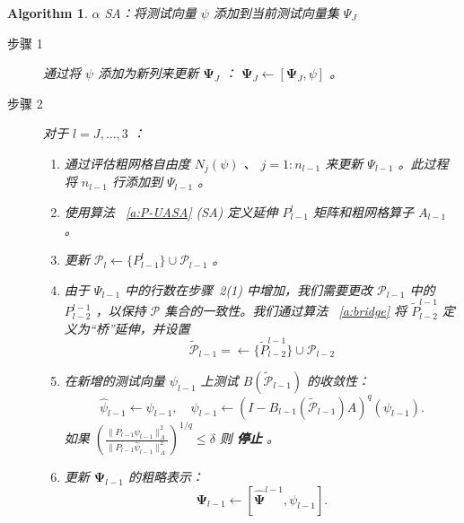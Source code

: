 \documentclass[12pt]{acta_2011xz}
\newcommand{\dof}{\ensuremath{N}}
\newtheorem{algorithm}[equation]{Algorithm}
\begin{document}
   \begin{algorithm}   \caption{   $\alpha$    SA：将测试向量    $\psi$    添加到当前测试向量集    $\Psi_J$       \label{a:SA}     }    
   \begin{description}   \item    [步骤 1] 通过将          $\psi$          添加为新列来更新          $\bm{\Psi}_J$         ：
         \(\bm{\Psi}_J\leftarrow [\bm{\Psi}_J, \psi]\)          。
   \item    [步骤 2] 对于          $l=J, \dots, 3$         ：
   \begin{enumerate}[(1)]

    \item   通过评估粗网格自由度                $\dof_j(\psi)$                、
               $j=1:n_{l-1}$                来更新                $\Psi_{l-1}$                。此过程将                $n_{l-1}$                行添加到                $\Psi_{l-1}$                。   \item   使用算法~    \ref{a:P-UASA}    (SA) 定义延伸
               $P_{l-1}^l$                矩阵和粗网格算子                $A_{l-1}$                。   \item   更新                $\mathcal{P}_{l} \leftarrow  \{ P_{l-1}^l \} \cup \mathcal{P}_{l-1}$                。   \item   由于                $\Psi_{l-1}$                中的行数在步骤~2(1) 中增加，我们需要更改                $\mathcal{P}_{l-1}$                中的                $P_{l-2}^{l-1}$               ，以保持                $\mathcal{P}$                集合的一致性。我们通过算法~   \ref{a:bridge}    将                $\widetilde{P}_{l-2}^{l-1}$                定义为“桥”延伸，并设置                \[
\widetilde{\mathcal{P}}_{l-1} = 
\leftarrow  \{ \widetilde{P}_{l-2}^{l-1} \} \cup \mathcal{P}_{l-2} 
\]                  \item   在新增的测试向量                $\psi_{l-1}$                上测试                $B(\widetilde{\mathcal{P}}_{l-1})$                的收敛性：
   \begin{equation*}
\hat \psi_{l-1}\leftarrow \psi_{l-1},\quad
\psi_{l-1}\leftarrow (I - B_{l-1}(\widetilde{\mathcal{P}}_{l-1})A)^q(\psi_{l-1}).
\end{equation*}    如果
               $\left(\frac{\|P_{l-1}\psi_{l-1}\|^2_A}{\|P_{l-1}\widehat\psi_{l-1}\|^2_A}\right)^{1/q}\le
\delta$                则  {    \bf    停止   }  。   \item   更新                $\bm{\Psi}_{l-1}$                的粗略表示：
   \begin{equation*}
      \bm{\Psi}_{l-1}\leftarrow [\hat{\bm{\Psi}}^{l-1}, \psi_{l-1}].
    \end{equation*}     \end{enumerate}     \end{description}     \end{algorithm}     
\end{document}
